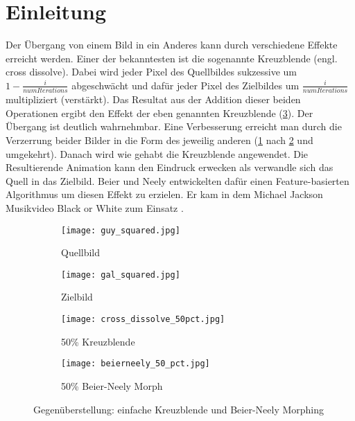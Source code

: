 \section*{Einleitung}

Der Übergang von einem Bild in ein Anderes kann durch verschiedene
Effekte erreicht werden. Einer der bekanntesten ist die sogenannte
Kreuzblende (engl. cross dissolve). Dabei wird jeder Pixel des Quellbildes
sukzessive um $1-\frac{i}{numIterations}$ abgeschwächt und dafür jeder Pixel
des Zielbildes um $\frac{i}{numIterations}$ multipliziert (verstärkt). 
Das Resultat aus der Addition dieser beiden Operationen ergibt den
Effekt der eben genannten Kreuzblende (\ref{fig:dissolve}). Der Übergang
ist deutlich wahrnehmbar. Eine Verbesserung erreicht man durch die Verzerrung
beider Bilder in die Form des jeweilig anderen (\ref{fig:source} nach \ref{fig:dest} und umgekehrt).
Danach wird wie gehabt die Kreuzblende angewendet.
Die Resultierende Animation
kann den Eindruck erwecken als verwandle sich das Quell in das Zielbild.
Beier und Neely \cite{beierneely} entwickelten dafür einen Feature-basierten 
Algorithmus um diesen Effekt zu erzielen. Er kam in dem Michael Jackson Musikvideo
Black or White zum Einsatz \cite{cartoonbrew}.
\begin{figure}[!htb]
	
	\centering
	\begin{subfigure}{0.4\textwidth}
		\centering
		\texttt{[image: guy\_squared.jpg]}
		\caption{Quellbild}
		\label{fig:source}
	\end{subfigure}
	\hfill
	\begin{subfigure}{0.4\textwidth}
		\centering
		\texttt{[image: gal\_squared.jpg]}
		\caption{Zielbild}
		\label{fig:dest}
	\end{subfigure}
	
	\centering
	\begin{subfigure}{0.4\textwidth}
		\centering
		\texttt{[image: cross\_dissolve\_50pct.jpg]}
		\caption{50\% Kreuzblende}
		\label{fig:dissolve}
	\end{subfigure}
	\hfill
	\begin{subfigure}{0.4\textwidth}
		\centering
		\texttt{[image: beierneely\_50\_pct.jpg]}
		\caption{50\% Beier-Neely Morph}
		\label{fig:morph}
	\end{subfigure}
	\caption{Gegenüberstellung: einfache Kreuzblende und Beier-Neely Morphing}
	\label{fig:side-by-side}
	
\end{figure}
